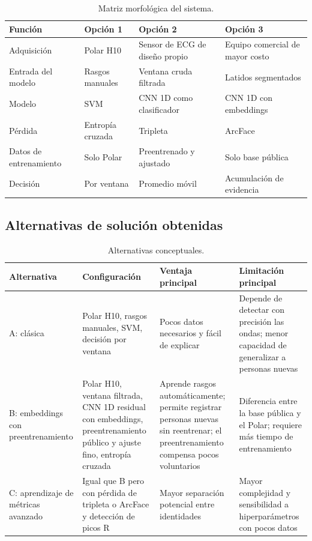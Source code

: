 \begin{table}[htbp]
\centering
\caption{Matriz morfológica del sistema.}
\label{tab:morfologica}
\small
\begin{tabularx}{\textwidth}{l X X X}
\toprule
\textbf{Función} & \textbf{Opción 1} & \textbf{Opción 2} & \textbf{Opción 3} \\
\midrule
Adquisición & Polar H10 & Sensor de ECG de diseño propio & Equipo comercial de mayor costo \\
Entrada del modelo & Rasgos manuales & Ventana cruda filtrada & Latidos segmentados \\
Modelo & SVM & CNN 1D como clasificador & CNN 1D con embeddings \\
Pérdida & Entropía cruzada & Tripleta & ArcFace \\
Datos de entrenamiento & Solo Polar & Preentrenado y ajustado & Solo base pública \\
Decisión & Por ventana & Promedio móvil & Acumulación de evidencia \\
\bottomrule
\end{tabularx}
\end{table}

\subsection{Alternativas de solución obtenidas}

\begin{table}[htbp]
\centering
\caption{Alternativas conceptuales.}
\label{tab:alternativas}
\small
\begin{tabularx}{\textwidth}{l X X X}
\toprule
\textbf{Alternativa} & \textbf{Configuración} & \textbf{Ventaja principal} & \textbf{Limitación principal} \\
\midrule
A: clásica & Polar H10, rasgos manuales, SVM, decisión por ventana & Pocos datos necesarios y fácil de explicar & Depende de detectar con precisión las ondas; menor capacidad de generalizar a personas nuevas \\
B: embeddings con preentrenamiento & Polar H10, ventana filtrada, CNN 1D residual con embeddings, preentrenamiento público y ajuste fino, entropía cruzada & Aprende rasgos automáticamente; permite registrar personas nuevas sin reentrenar; el preentrenamiento compensa pocos voluntarios & Diferencia entre la base pública y el Polar; requiere más tiempo de entrenamiento \\
C: aprendizaje de métricas avanzado & Igual que B pero con pérdida de tripleta o ArcFace y detección de picos R & Mayor separación potencial entre identidades & Mayor complejidad y sensibilidad a hiperparámetros con pocos datos \\
\bottomrule
\end{tabularx}
\end{table}

